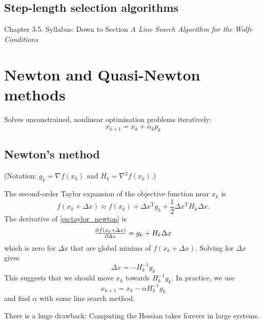 \documentclass[a4paper, 12pt]{article}
\theoremstyle{definition}
\newcommand{\T}{^{\scriptscriptstyle \text{T}}}
\begin{document}
\subsection{Step-length selection algorithms}
Chapter 3.5. Syllabus: Down to Section \emph{A Line Search Algorithm for the Wolfe Conditions}

\section{Newton and Quasi-Newton methods}
Solves unconstrained, nonlinear optimisation problems iteratively:
\begin{equation}
	x_{k+1} = x_k + \alpha_k p_k
\end{equation}

\subsection{Newton's method}
(Notation: \( g_k = \nabla f(x_k) \) and \( H_k = \nabla^2 f(x_k) \).)

The second-order Taylor expansion of the objective function near \(x_k\) is
\begin{equation}\label{eq:taylor_newton}
	f(x_k + \Delta x) \approx f(x_k) + \Delta x\T g_k + \frac{1}{2} \Delta x\T H_k \Delta x
	.
\end{equation}
The derivative of \eqref{eq:taylor_newton} is
\begin{equation}\label{eq:newton_derivative}
	\pd{f(x_k + \Delta x)}{\Delta x} = g_k + H_k \Delta x
\end{equation}
which is zero for \( \Delta x \) that are global minima of \( f(x_k + \Delta x) \). Solving for \( \Delta x \) gives
\begin{equation}
	\Delta x = - H_k^{-1} g_k
\end{equation}
This suggests that we should move \(x_k\) towards \( H_k^{-1} g_k \). In practice, we use
\begin{equation}
	x_{k+1} = x_k - \alpha H_k^{-1} g_k
\end{equation}
and find \(\alpha\) with some line search method.

There is a huge drawback: Computing the Hessian takes forever in large systems.
\end{document}
